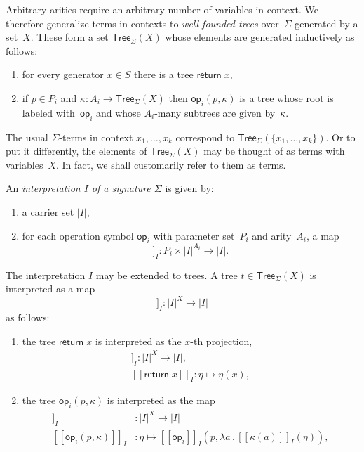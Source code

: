 \documentclass{amsart}
\newcommand{\carrier}[1]{|#1|} %
\newcommand{\set}[1]{\{#1\}} %
\newcommand{\lam}[1]{\lambda #1 \,.\,}
\newcommand{\Tree}[2]{\mathsf{Tree}_{#1}(#2)} %
\newcommand{\leaf}[1]{\return{#1}} %
\newcommand{\op}[1]{\mathsf{op}_{#1}} %
\newcommand{\sem}[1]{[\![#1]\!]} %
\newcommand{\kode}[1]{\mathsf{#1}}
\newcommand{\return}[1]{\kode{return}\;#1}
\begin{document}
Arbitrary arities require an arbitrary number of variables in context. We therefore
generalize terms in contexts to \emph{well-founded trees} over~$\Sigma$
generated by a set~$X$. These form a set $\Tree{\Sigma}{X}$ whose elements are
generated inductively as follows:
%
\begin{enumerate}
\item for every generator $x \in S$ there is a tree $\leaf{x}$,
\item if $p \in P_i$ and $\kappa : A_i \to \Tree{\Sigma}{X}$ then
  $\op{i}(p, \kappa)$ is a tree whose root is labeled with~$\op{i}$ and whose
  $A_i$-many subtrees are given by~$\kappa$.
\end{enumerate}
%
The usual $\Sigma$-terms in context $x_1, \ldots, x_k$ correspond to
$\Tree{\Sigma}{\set{x_1, \ldots, x_k}}$. Or to put it differently, the elements
of $\Tree{\Sigma}{X}$ may be thought of as terms with variables~$X$. In fact, we
shall customarily refer to them as terms.

An \emph{interpretation $I$ of a signature $\Sigma$} is given by:
%
\begin{enumerate}
\item a carrier set $\carrier{I}$,
\item for each operation symbol $\op{i}$ with parameter set~$P_i$ and arity~$A_i$,
  a map
  \begin{equation*}
    \sem{\op{i}}_I : P_i \times \carrier{I}^{A_i} \longrightarrow \carrier{I}.
  \end{equation*}
\end{enumerate}
%
The interpretation $I$ may be extended to trees. A tree $t \in \Tree{\Sigma}{X}$
is interpreted as a map
%
\begin{equation*}
  \sem{t}_I : \carrier{I}^X \to \carrier{I}
\end{equation*}
%
as follows:
%
\begin{enumerate}
\item the tree $\leaf{x}$ is interpreted as the $x$-th projection,
  \begin{align*}
    \sem{\leaf{x}}_I : \carrier{I}^X \to \carrier{I},\\
    \sem{\leaf{x}}_I : \eta \mapsto \eta(x),
  \end{align*}
\item the tree $\op{i}(p, \kappa)$ is interpreted as the map
  \begin{align*}
    \sem{\op{i}(p, \kappa)}_I &: \carrier{I}^X \longrightarrow \carrier{I} \\
    \sem{\op{i}(p, \kappa)}_I &:
      \eta \mapsto
      \sem{\op{i}}_I(p, \lam{a} \sem{\kappa(a)}_I(\eta)),
  \end{align*}
\end{enumerate}
\end{document}
